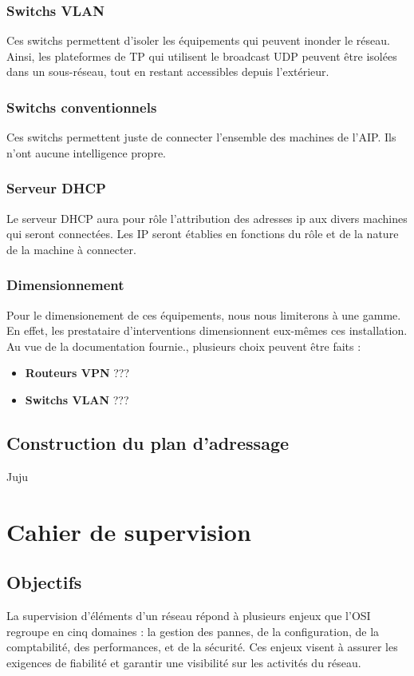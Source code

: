 \documentclass[a4paper]{article}
\begin{document}
	\subsubsection{Switchs VLAN}
Ces switchs permettent d'isoler les équipements qui peuvent inonder le réseau. Ainsi, les plateformes de TP qui utilisent le broadcast UDP peuvent être isolées dans un sous-réseau, tout en restant accessibles depuis l'extérieur.
	
	\subsubsection{Switchs conventionnels}
Ces switchs permettent juste de connecter l'ensemble des machines de l'AIP. Ils n'ont aucune intelligence propre.
	
	\subsubsection{Serveur DHCP}
Le serveur DHCP aura pour rôle l'attribution des adresses ip aux divers machines qui seront connectées. Les IP seront établies en fonctions du rôle et de la nature de la machine à connecter.

	\subsubsection{Dimensionnement}
Pour le dimensionement de ces équipements, nous nous limiterons à une gamme. En effet, les prestataire d'interventions dimensionnent eux-mêmes ces installation.\\
Au vue de la documentation fournie., plusieurs choix peuvent être faits : 
\begin{itemize}
	\item \textbf{Routeurs VPN} ???
	\item \textbf{Switchs VLAN} ???
\end{itemize}
	
	\subsection{Construction du plan d'adressage}
	Juju
	
\section{Cahier de supervision}

\subsection{Objectifs}
La supervision d'éléments d'un réseau répond à plusieurs enjeux que l'OSI regroupe en cinq domaines : la gestion des pannes, de la configuration, de la comptabilité, des performances, et de la sécurité. Ces enjeux visent à assurer les exigences de fiabilité et garantir une visibilité sur les activités du réseau.  
\end{document}
